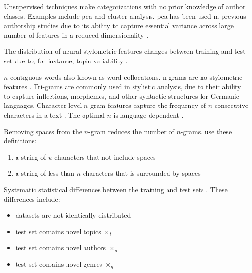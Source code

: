 \begin{definition}
    Unsupervised techniques make categorizations with no prior knowledge of author classes.
    Examples include \ac{pca} and cluster analysis.
    \ac{pca} has been used in previous authorship studies due to its ability to 
    capture essential variance across large number of features in a reduced dimensionality \cite{abbasi_writeprints_2008}.
\end{definition}

\begin{definition}
    The distribution of neural stylometric features changes between training and test set due to, for instance, topic variability \cite{boenninghoff_o2d2_2021}.
\end{definition}

\begin{definition}
    [n-gram]
    $n$ contiguous words also known as word collocations. 
    n-grams are no stylometric features \cite{altakrori_topic_2021}.
    Tri-grams are commonly used in stylistic analysis, due to their ability to capture inflections, %
    morphemes, %
    and other syntactic structures for Germanic languages.
    Character-level $n$-gram features capture the frequency of $n$ consecutive characters in a text \cite{neal_surveying_2018}.
    The optimal $n$ is language dependent \cite{neal_surveying_2018}.
\end{definition}

\begin{definition}
    Removing spaces from the $n$-gram reduces the number of $n$-grams.
    \citet{koppel_authorship_2011} use these definitions:
    \begin{enumerate}
        \item a string of $n$ characters that not include spaces
        \item a string of less than $n$ characters that is surrounded by spaces
    \end{enumerate}
\end{definition}

\begin{definition}
    Systematic statistical differences between the training and test sets \cite{tyo_state_2022}.
    These differences include:
    \begin{itemize}
        \item datasets are not identically distributed
        \item test set contains novel topics $\times_t$
        \item test set contains novel authors $\times_a$
        \item test set contains novel genres $\times_g$
    \end{itemize}
\end{definition}

